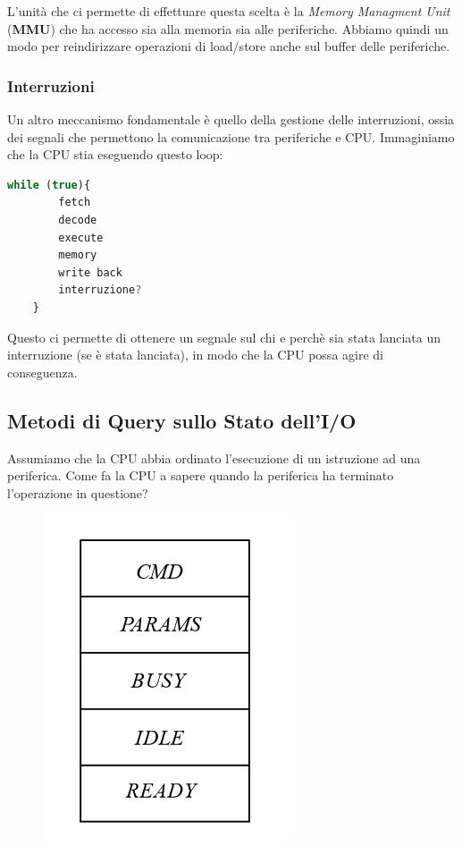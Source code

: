 \documentclass{article}
\begin{document}
\vspace*{10px}

L'unità che ci permette di effettuare questa scelta è la \textit{Memory Managment Unit} (\textbf{MMU}) che ha accesso sia alla memoria sia alle periferiche. Abbiamo quindi un modo per reindirizzare operazioni di load/store anche sul buffer delle periferiche.

\subsubsection{Interruzioni}

Un altro meccanismo fondamentale è quello della gestione delle interruzioni, ossia dei segnali che permettono la comunicazione tra periferiche e CPU. Immaginiamo che la CPU stia eseguendo questo loop:

\vspace*{10px}

\begin{lstlisting}[language = JavaScript]
    while (true){
        fetch
        decode
        execute
        memory
        write back
        interruzione?
    }
\end{lstlisting}

Questo ci permette di ottenere un segnale sul chi e perchè sia stata lanciata un interruzione (se è stata lanciata), in modo che la CPU possa agire di conseguenza.

\newpage

\subsection{Metodi di Query sullo Stato dell'I/O}

Assumiamo che la CPU abbia ordinato l'esecuzione di un istruzione ad una periferica. Come fa la CPU a sapere quando la periferica ha terminato l'operazione in questione? 

    \begin{figure}[htbp]
        \center
        \includegraphics[scale=0.45]{img/buffer_periferica.png}
    \end{figure}
\end{document}
